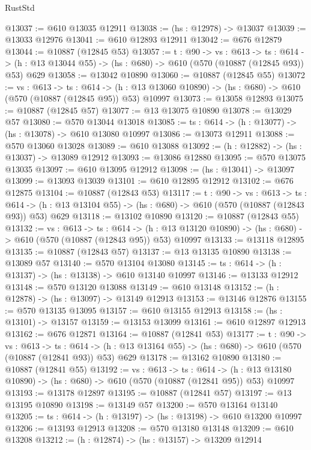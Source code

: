 \begin{lexlean}{RustStd}
\begin{coremodule}
@13037 := @610 @13035 @12911
@13038 := (hs : @12978) -> @13037
@13039 := @13033 @12976
@13041 := @610 @12893 @12911
@13042 := @676 @12879
@13044 := @10887 (@12845 @53)
@13057 := {t : @90} ->
  {vs : @613} ->
  {ts : @614} -> (h : @13 @13044 @55) -> (hs : @680) -> @610 (@570 (@10887 (@12845 @93)) @53) @629
@13058 := @13042 @10890
@13060 := @10887 (@12845 @55)
@13072 := {vs : @613} ->
  {ts : @614} ->
  (h : @13 @13060 @10890) -> (hs : @680) -> @610 (@570 (@10887 (@12845 @95)) @53) @10997
@13073 := @13058 @12893
@13075 := @10887 (@12845 @57)
@13077 := @13 @13075 @10890
@13078 := @13029 @57
@13080 := @570 @13044 @13018
@13085 := {ts : @614} -> (h : @13077) -> (hs : @13078) -> @610 @13080 @10997
@13086 := @13073 @12911
@13088 := @570 @13060 @13028
@13089 := @610 @13088
@13092 := (h : @12882) -> (hs : @13037) -> @13089 @12912
@13093 := @13086 @12880
@13095 := @570 @13075 @13035
@13097 := @610 @13095 @12912
@13098 := (hs : @13041) -> @13097
@13099 := @13093 @13039
@13101 := @610 @12895 @12912
@13102 := @676 @12875
@13104 := @10887 (@12843 @53)
@13117 := {t : @90} ->
  {vs : @613} ->
  {ts : @614} -> (h : @13 @13104 @55) -> (hs : @680) -> @610 (@570 (@10887 (@12843 @93)) @53) @629
@13118 := @13102 @10890
@13120 := @10887 (@12843 @55)
@13132 := {vs : @613} ->
  {ts : @614} ->
  (h : @13 @13120 @10890) -> (hs : @680) -> @610 (@570 (@10887 (@12843 @95)) @53) @10997
@13133 := @13118 @12895
@13135 := @10887 (@12843 @57)
@13137 := @13 @13135 @10890
@13138 := @13089 @57
@13140 := @570 @13104 @13080
@13145 := {ts : @614} -> (h : @13137) -> (hs : @13138) -> @610 @13140 @10997
@13146 := @13133 @12912
@13148 := @570 @13120 @13088
@13149 := @610 @13148
@13152 := (h : @12878) -> (hs : @13097) -> @13149 @12913
@13153 := @13146 @12876
@13155 := @570 @13135 @13095
@13157 := @610 @13155 @12913
@13158 := (hs : @13101) -> @13157
@13159 := @13153 @13099
@13161 := @610 @12897 @12913
@13162 := @676 @12871
@13164 := @10887 (@12841 @53)
@13177 := {t : @90} ->
  {vs : @613} ->
  {ts : @614} -> (h : @13 @13164 @55) -> (hs : @680) -> @610 (@570 (@10887 (@12841 @93)) @53) @629
@13178 := @13162 @10890
@13180 := @10887 (@12841 @55)
@13192 := {vs : @613} ->
  {ts : @614} ->
  (h : @13 @13180 @10890) -> (hs : @680) -> @610 (@570 (@10887 (@12841 @95)) @53) @10997
@13193 := @13178 @12897
@13195 := @10887 (@12841 @57)
@13197 := @13 @13195 @10890
@13198 := @13149 @57
@13200 := @570 @13164 @13140
@13205 := {ts : @614} -> (h : @13197) -> (hs : @13198) -> @610 @13200 @10997
@13206 := @13193 @12913
@13208 := @570 @13180 @13148
@13209 := @610 @13208
@13212 := (h : @12874) -> (hs : @13157) -> @13209 @12914

\end{coremodule}
\end{lexlean}
